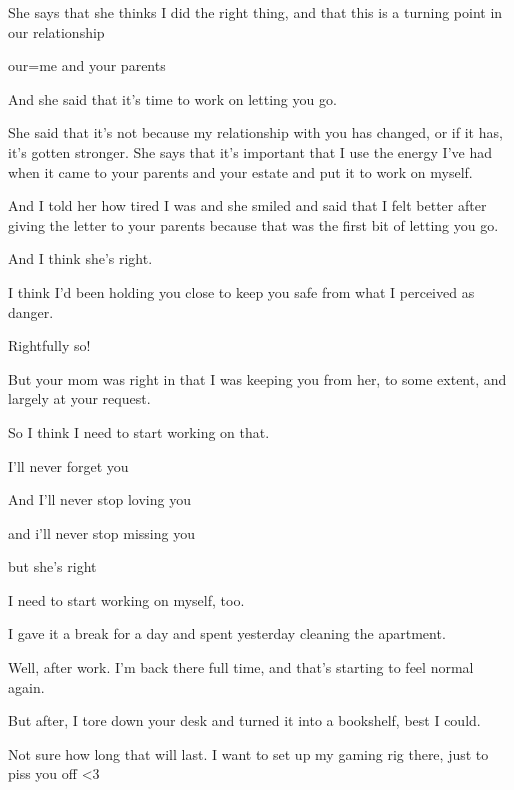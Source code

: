 { She says that she thinks I did the right thing, and that this is a turning point in our relationship

 our=me and your parents

 And she said that it's time to work on letting you go.

 She said that it's not because my relationship with you has changed, or if it has, it's gotten stronger. She says that it's important that I use the energy I've had when it came to your parents and your estate and put it to work on myself.

 And I told her how tired I was and she smiled and said that I felt better after giving the letter to your parents because that was the first bit of letting you go.

 And I think she's right.

 I think I'd been holding you close to keep you safe from what I perceived as danger.

 Rightfully so!

 But your mom was right in that I was keeping you from her, to some extent, and largely at your request.

 So I think I need to start working on that.

 I'll never forget you

 And I'll never stop loving you

 and i'll never stop missing you

 but she's right

 I need to start working on myself, too.

\nopagebreak

 I gave it a break for a day and spent yesterday cleaning the apartment.

 Well, after work. I'm back there full time, and that's starting to feel normal again.

 But after, I tore down your desk and turned it into a bookshelf, best I could.

 Not sure how long that will last. I want to set up my gaming rig there, just to piss you off \textless{}3

}
